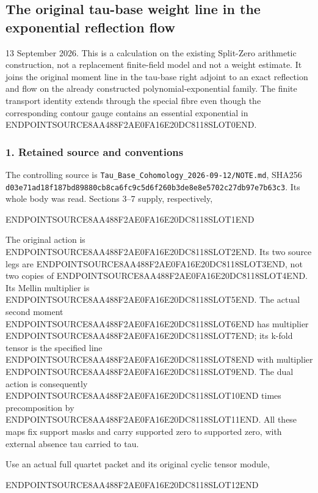 \subsection{The original tau-base weight line in the exponential reflection flow}\label{endpoint-f1_reflection--the-original-tau-base-weight-line-in-the-exponential-reflection-flow}

13 September 2026. This is a calculation on the existing Split-Zero arithmetic construction, not a replacement finite-field model and not a weight estimate. It joins the original moment line in the tau-base right adjoint to an exact reflection and flow on the already constructed polynomial-exponential family. The finite transport identity extends through the special fibre even though the corresponding contour gauge contains an essential exponential in ENDPOINTSOURCE8AA488F2AE0FA16E20DC8118SLOT0END.

\subsubsection{1. Retained source and conventions}\label{endpoint-f1_reflection--retained-source-and-conventions}

The controlling source is \texttt{Tau\_Base\_Cohomology\_2026-09-12/NOTE.md}, SHA256 \texttt{d03e71ad18f187bd89880cb8ca6fc9c5d6f260b3de8e8e5702c27db97e7b63c3}. Its whole body was read. Sections 3--7 supply, respectively,

ENDPOINTSOURCE8AA488F2AE0FA16E20DC8118SLOT1END

The original action is ENDPOINTSOURCE8AA488F2AE0FA16E20DC8118SLOT2END. Its two source legs are ENDPOINTSOURCE8AA488F2AE0FA16E20DC8118SLOT3END, not two copies of ENDPOINTSOURCE8AA488F2AE0FA16E20DC8118SLOT4END. Its Mellin multiplier is ENDPOINTSOURCE8AA488F2AE0FA16E20DC8118SLOT5END. The actual second moment ENDPOINTSOURCE8AA488F2AE0FA16E20DC8118SLOT6END has multiplier ENDPOINTSOURCE8AA488F2AE0FA16E20DC8118SLOT7END; its k-fold tensor is the specified line ENDPOINTSOURCE8AA488F2AE0FA16E20DC8118SLOT8END with multiplier ENDPOINTSOURCE8AA488F2AE0FA16E20DC8118SLOT9END. The dual action is consequently ENDPOINTSOURCE8AA488F2AE0FA16E20DC8118SLOT10END times precomposition by ENDPOINTSOURCE8AA488F2AE0FA16E20DC8118SLOT11END. All these maps fix support masks and carry supported zero to supported zero, with external absence tau carried to tau.

Use an actual full quartet packet and its original cyclic tensor module,

ENDPOINTSOURCE8AA488F2AE0FA16E20DC8118SLOT12END

